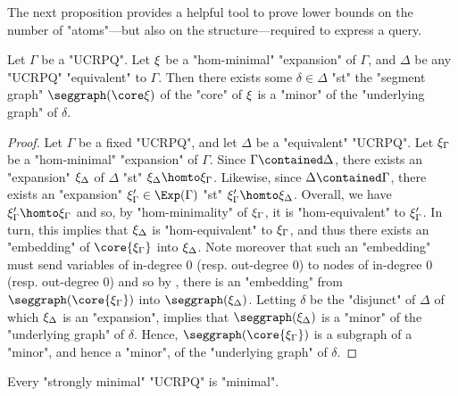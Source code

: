 The next proposition provides a helpful tool to prove lower bounds on the
number of "atoms"---but also on the structure---required to express a query.
\AP{}

\begin{theorem}
	\AP\label{thm:structure-theorem}
	Let $\Gamma$ be a "UCRPQ".
	Let $\xi$ be a "hom-minimal" "expansion" of $\Gamma$,
	and $\Delta$ be any "UCRPQ" "equivalent" to $\Gamma$.
	Then there exists some $\delta \in \Delta$ "st" the "segment graph" $\seggraph(\core\anexpansion)$
	of the "core" of $\xi$ is a "minor" of the "underlying graph" of $\delta$. 
\end{theorem}

\begin{proof}
	Let $\Gamma$ be a fixed "UCRPQ", and let $\Delta$ be a "equivalent" "UCRPQ".
	Let $\xi_\Gamma$ be a "hom-minimal" "expansion" of $\Gamma$.
	Since $\Gamma \contained \Delta$, there exists an "expansion" $\xi_\Delta$ of $\Delta$
	"st" $\anexpansion_\Delta \homto \anexpansion_\Gamma$. Likewise, since $\Delta \contained \Gamma$, there exists an "expansion" $\anexpansion'_\Gamma \in \Exp(\Gamma)$ "st"
	$\anexpansion'_\Gamma \homto \anexpansion_\Delta$. Overall, we have
	$\anexpansion'_\Gamma \homto \anexpansion_\Gamma$ and so,
	by "hom-minimality" of $\xi_\Gamma$, it is "hom-equivalent" to $\xi'_\Gamma$. In turn, this implies that $\xi_\Delta$ is "hom-equivalent" to $\xi_\Gamma$, 
	and thus there exists an "embedding" of
	$\core{\anexpansion_\Gamma}$ into $\xi_\Delta$.
	Note moreover that such an "embedding" must send variables of
	in-degree 0 (resp. out-degree 0) to nodes of in-degree 0 (resp. out-degree 0)
	and so by ,
	there is an "embedding" from $\seggraph(\core{\anexpansion_\Gamma})$
	into $\seggraph(\anexpansion_\Delta)$.
	Letting $\delta$ be the "disjunct" of $\Delta$ of which $\xi_\Delta$ is an "expansion",
	 implies that $\seggraph(\anexpansion_\Delta)$ is a
	"minor" of the "underlying graph" of $\delta$.
	Hence, $\seggraph(\core{\anexpansion_\Gamma})$ is a subgraph of a "minor", and hence a "minor", of the "underlying graph" of $\delta$.
\end{proof}

\begin{corollary}
	\AP\label{coro:strong-min}
	Every "strongly minimal" "UCRPQ" is "minimal".
\end{corollary}


